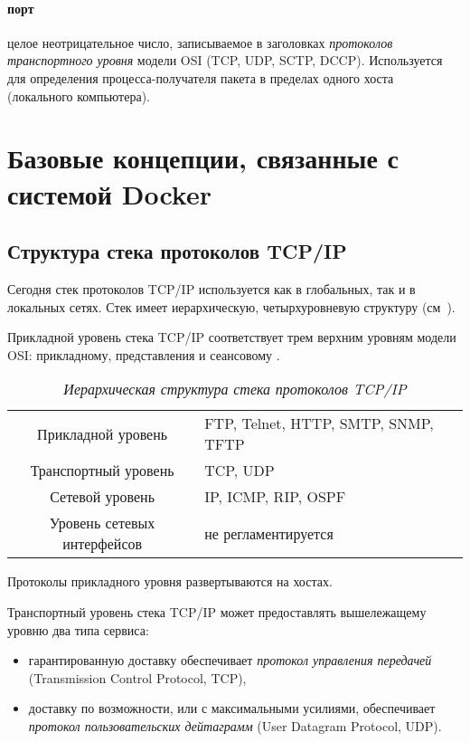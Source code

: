 \documentclass[%
	11pt,
	a4paper,
	utf8,
		]{article}
\begin{document}
\paragraph{{порт}} целое неотрицательное число, записываемое в заголовках \emph{протоколов транспортного уровня} модели OSI (TCP, UDP, SCTP, DCCP). Используется для определения процесса-получателя пакета в пределах одного хоста (локального компьютера).

\section{Базовые концепции, связанные с системой Docker}

\subsection{Структура стека протоколов TCP/IP}

Сегодня стек протоколов TCP/IP используется как в глобальных, так и в локальных сетях. Стек имеет иерархическую, четырхуровневую структуру (см~).

Прикладной уровень стека TCP/IP соответствует трем верхним уровням модели OSI: прикладному, представления и сеансовому \cite{olifer:compnets-2020}.

\begin{table}[h]
	\centering
	\caption{\itshape Иерархическая структура стека протоколов TCP/IP}\label{tab:tcpip}
	\begin{tabular}{cl}
		\rowcolor[gray]{0.96} {Прикладной уровень} & FTP, Telnet, HTTP, SMTP, SNMP, TFTP \\
		Транспортный уровень & TCP, UDP \\
		\rowcolor[gray]{0.96} {Сетевой уровень} & IP, ICMP, RIP, OSPF \\
		Уровень сетевых интерфейсов & не регламентируется
	\end{tabular}
\end{table}

Протоколы прикладного уровня развертываются на хостах.

Транспортный уровень стека TCP/IP может предоставлять вышележащему уровню два типа сервиса:

\begin{itemize}
	\item гарантированную доставку обеспечивает \emph{протокол управления передачей} (Transmission Control Protocol, TCP),
	
	\item доставку по возможности, или с максимальными усилиями, обеспечивает \emph{протокол пользовательских дейтаграмм} (User Datagram Protocol, UDP).
\end{itemize}
\end{document}
